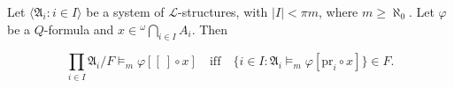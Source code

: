 Let $\langle \mathfrak{A}_i : i \in I \rangle$ be a system of $\mathcal{L}$-structures, with $|I| < \pi m$, where $m \geq \aleph_0$. Let $\varphi$ be a $Q$-formula and $x \in {}^\omega \bigcap_{i \in I} A_i$. Then

$$\prod_{i \in I} \mathfrak{A}_i / F \models_m \varphi[[\ ] \circ x] \quad \text{iff} \quad \{i \in I : \mathfrak{A}_i \models_m \varphi[\text{pr}_i \circ x]\} \in F.$$
